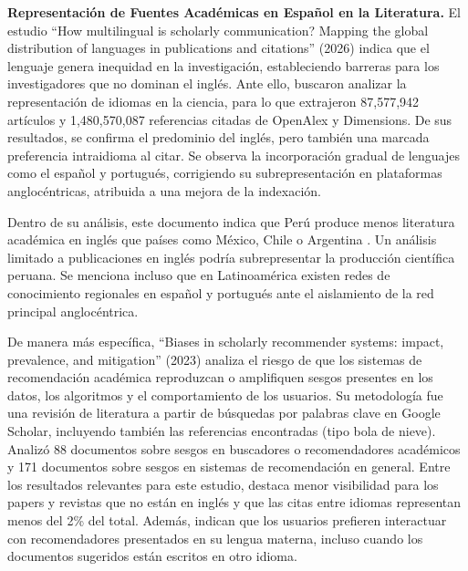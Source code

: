 \documentclass[conference]{IEEEtran}
\begin{document}
\textbf{Representación de Fuentes Académicas en Español en la Literatura.} El estudio ``How multilingual is scholarly communication? Mapping the global distribution of languages in publications and citations'' (2026) \cite{pradier2026} indica que el lenguaje genera inequidad en la investigación, estableciendo barreras para los investigadores que no dominan el inglés. Ante ello, buscaron analizar la representación de idiomas en la ciencia, para lo que extrajeron 87,577,942 artículos y 1,480,570,087 referencias citadas de OpenAlex y Dimensions. De sus resultados, se confirma el predominio del inglés, pero también una marcada preferencia intraidioma al citar. Se observa la incorporación gradual de lenguajes como el español y portugués, corrigiendo su subrepresentación en plataformas anglocéntricas, atribuida a una mejora de la indexación.

Dentro de su análisis, este documento indica que Perú produce menos literatura académica en inglés que países como México, Chile o Argentina \cite{pradier2026}. Un análisis limitado a publicaciones en inglés podría subrepresentar la producción científica peruana. Se menciona incluso que en Latinoamérica existen redes de conocimiento regionales en español y portugués ante el aislamiento de la red principal anglocéntrica. 

De manera más específica, ``Biases in scholarly recommender systems: impact, prevalence, and mitigation'' (2023) \cite{farber2023biases} analiza el riesgo de que los sistemas de recomendación académica reproduzcan o amplifiquen sesgos presentes en los datos, los algoritmos y el comportamiento de los usuarios. Su metodología fue una revisión de literatura a partir de búsquedas por palabras clave en Google Scholar, incluyendo también las referencias encontradas (tipo bola de nieve). Analizó 88 documentos sobre sesgos en buscadores o recomendadores académicos y 171 documentos sobre sesgos en sistemas de recomendación en general. Entre los resultados relevantes para este estudio, destaca menor visibilidad para los papers y revistas que no están en inglés y que las citas entre idiomas representan menos del 2\% del total. Además, indican que los usuarios prefieren interactuar con recomendadores presentados en su lengua materna, incluso cuando los documentos sugeridos están escritos en otro idioma.
\end{document}
